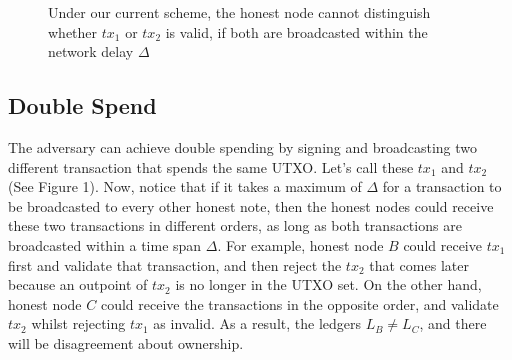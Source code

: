 \begin{figure}[]
    \caption{Under our current scheme, the honest node cannot distinguish whether $tx_1$ or $tx_2$ is valid, if both are broadcasted within the network delay $\Delta$}
    \label{fig:my_label}
\end{figure}

\subsection{Double Spend}

The adversary can achieve double spending by signing and broadcasting two different transaction that spends the same UTXO. Let's call these $tx_1$ and $tx_2$ (See Figure 1). Now, notice that if it takes a maximum of $\Delta$ for a transaction to be broadcasted to every other honest note, then the honest nodes could receive these two transactions in different orders, as long as both transactions are broadcasted within a time span $\Delta$. For example, honest node $B$ could receive $tx_1$ first and validate that transaction, and then reject the $tx_2$ that comes later because an outpoint of $tx_2$ is no longer in the UTXO set. On the other hand, honest node $C$ could receive the transactions in the opposite order, and validate $tx_2$ whilst rejecting $tx_1$ as invalid. As a result, the ledgers $L_B \neq L_C$, and there will be disagreement about ownership.


